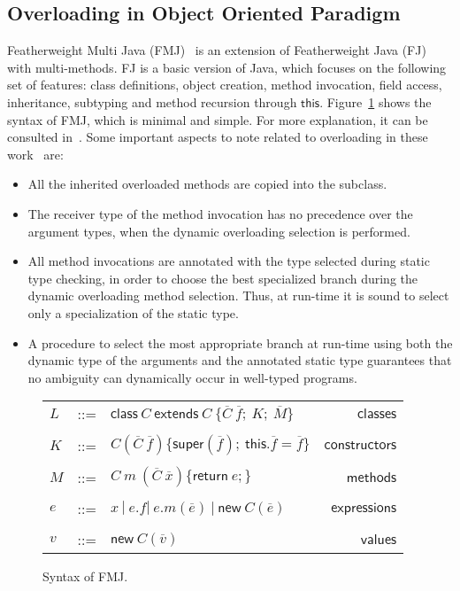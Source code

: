 \documentclass[hidelinks, twocolumn]{article}
\newcommand{\clases}[1][D]{\mathsf{class} \ C \ \mathsf{extends} \ #1 \ \{ \overline{C} \ \overline{f}; \ K; \ \overline{M}\}}
\newcommand{\constructor}{ C(\overline{C} \ \overline{f})\{\mathsf{super}(\overline{f}); \ \mathsf{this}.\overline{f} =  \overline{f} \}}
\newcommand{\metodo}[1][C]{#1 \ m \ (\overline{#1} \ \overline{x})\{\mathsf{return} \ e;\}}
\newcommand{\expresion}{x \ | \ e.f |\  \invocacion \ | \ \mathsf{new} \ C(\overline{e})}
\newcommand{\invocacion}{e.m(\overline{e})}
\newcommand{\valore}{\mathsf{new} \ C(\overline{v})}
\begin{document}
\subsection{Overloading in Object Oriented Paradigm}
Featherweight Multi Java (FMJ)~\cite{BETTINI2009261, FJM} is an extension of Featherweight Java (FJ)~\cite{FJ} with multi-methods. FJ is a basic version of Java, which focuses on the following set of features: class definitions, object creation, method invocation, field access, inheritance, subtyping and method recursion through $\mathsf{this}$. Figure~\ref{figure:syntax_of_FMJ} shows the syntax of FMJ, which is minimal and simple. For more explanation, it can be consulted in~\cite{BETTINI2009261}. Some important aspects to note related to overloading in these work~\cite{BETTINI2009261, FJM} are:
\begin{itemize}
  \item All the inherited overloaded methods are copied into the subclass.
  \item The receiver type of the method invocation has no precedence over the argument types, when the  dynamic overloading selection is performed.
  \item All method invocations are annotated with the type selected during static type checking, in order to choose the best specialized branch during the dynamic overloading method selection. Thus, at run-time it is sound  to select only a specialization of the static type.
  \item A procedure to select the most appropriate branch at run-time using both the dynamic type of the arguments and the annotated static type guarantees that no ambiguity can dynamically occur in well-typed programs.
\end{itemize}

\begin{figure}
\begin{small}
\begin{center}
\setlength{\tabcolsep}{1pt}
\begin{tabular}{l c l r}
$L$&::=&$\clases[C]$&$\mathsf {classes}$\\
&&&\\
$K$&::=&$\constructor$&$\mathsf {constructors}$\\
&&&\\
$M$&::=&$\metodo$&$\mathsf {methods}$\\
&&&\\
$e$&::=&$\expresion$&$\mathsf {expressions}$\\
&&&\\
$v$&::=&$\valore$&$\mathsf {values}$\\
\end{tabular}
\caption{Syntax of FMJ.}
\label{figure:syntax_of_FMJ}
\end{center}
\end{small}
\end{figure}
\end{document}
